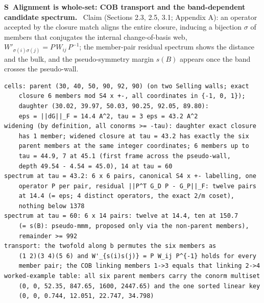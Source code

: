 \documentclass[11pt]{article}
\newcounter{scheck}
\renewcommand{\thescheck}{S\arabic{scheck}}
\newcommand{\sitem}[2]{\medskip\noindent\refstepcounter{scheck}\label{#1}\textbf{\thescheck\ #2.}\ }
\begin{document}
\sitem{z:transport}{Alignment is whole-set: COB transport and the band-dependent candidate spectrum}
Claim (Sections 2.3, 2.5, 3.1; Appendix A): an operator accepted by the closure match aligns the entire closure, inducing a bijection $\sigma$ of members that conjugates the internal change-of-basis web, $W'_{\sigma(i)\sigma(j)}=P\,W_{ij}\,P^{-1}$; the member-pair residual spectrum shows the distance and the bulk, and the pseudo-symmetry margin $s(B)$ appears once the band crosses the pseudo-wall.
\begin{footnotesize}\begin{verbatim}
cells: parent (30, 40, 50, 90, 92, 90) (on two Selling walls; exact
    closure 6 members mod S4 x +-, all coordinates in {-1, 0, 1});
    daughter (30.02, 39.97, 50.03, 90.25, 92.05, 89.80):
    eps = ||dG||_F = 14.4 A^2, tau = 3 eps = 43.2 A^2
widening (by definition, all conorms >= -tau): daughter exact closure
    has 1 member; widened closure at tau = 43.2 has exactly the six
    parent members at the same integer coordinates; 6 members up to
    tau = 44.9, 7 at 45.1 (first frame across the pseudo-wall,
    depth 49.54 - 4.54 = 45.0), 14 at tau = 60
spectrum at tau = 43.2: 6 x 6 pairs, canonical S4 x +- labelling, one
    operator P per pair, residual ||P^T G_D P - G_P||_F: twelve pairs
    at 14.4 (= eps; 4 distinct operators, the exact 2/m coset),
    nothing below 1378
spectrum at tau = 60: 6 x 14 pairs: twelve at 14.4, ten at 150.7
    (= s(B): pseudo-mmm, proposed only via the non-parent members),
    remainder >= 992
transport: the twofold along b permutes the six members as
    (1 2)(3 4)(5 6) and W'_{s(i)s(j)} = P W_ij P^{-1} holds for every
    member pair; the COB linking members 1->3 equals that linking 2->4
worked-example table: all six parent members carry the conorm multiset
    (0, 0, 52.35, 847.65, 1600, 2447.65) and the one sorted linear key
    (0, 0, 0.744, 12.051, 22.747, 34.798)
\end{verbatim}\end{footnotesize}
\end{document}
